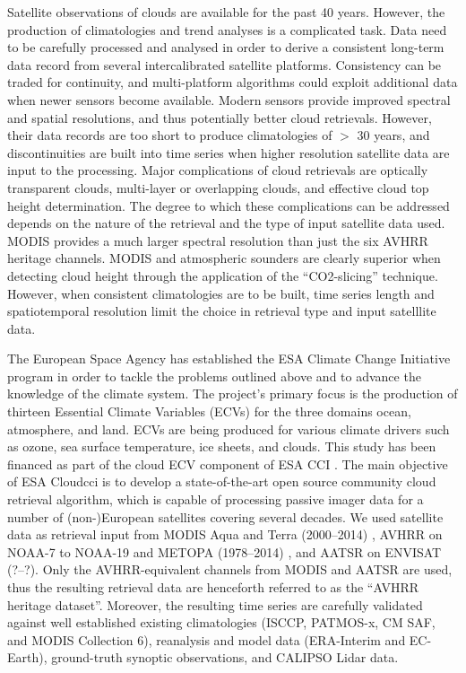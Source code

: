 Satellite observations of clouds are available for the past 40 years. However,
the production of climatologies and trend analyses is a complicated
task. Data need to be carefully processed and analysed in order
to derive a consistent long-term data record from several intercalibrated satellite
platforms. Consistency can be traded for continuity, and multi-platform
algorithms could exploit additional data when newer sensors become
available. Modern sensors provide improved spectral and spatial resolutions,
and thus potentially better cloud retrievals. However, their data records are too short to produce
climatologies of $>$ 30 years, and discontinuities are built into time series
when higher resolution satellite data are input to the processing.
Major complications of cloud retrievals are optically transparent clouds, multi-layer or overlapping clouds, and effective cloud top height determination. The degree to which these complications can be addressed depends on the nature of the retrieval and the type of input satellite data used. MODIS provides a much larger spectral resolution than just the six AVHRR heritage channels. MODIS and atmospheric sounders are clearly superior when detecting cloud height through the application of the ``CO2-slicing'' technique. However, when consistent climatologies are to be built, time series length and spatiotemporal resolution limit the choice in retrieval type and input satelllite data.  

\newpage

The European Space Agency has established the ESA Climate
Change Initiative program \citep{ESA_CCI_web,Hollmann13} in order to tackle
the problems outlined above and to advance the knowledge of the climate system.
The project's primary focus is the production of
thirteen Essential Climate Variables (ECVs) for the three domains ocean,
atmosphere, and land. ECVs are being produced for various climate drivers such as ozone, sea surface
temperature, ice sheets, and clouds. This study has been financed as part of the cloud ECV component of
ESA CCI \citep{ESA_Cloud_CCI_web}.
The main objective of ESA Cloud\textunderscore cci is to develop a state-of-the-art open source community
cloud retrieval algorithm, which is capable of processing passive imager data for a
number of \mbox{(non-)European} satellites covering several decades.
We used satellite data as retrieval input from MODIS Aqua and Terra (2000--2014) \citep{King92}, AVHRR on NOAA-7 to
NOAA-19 and METOPA (1978--2014) \citep{Jacobowitz03}, and AATSR on ENVISAT (?--?).
Only the AVHRR-equivalent channels from MODIS and AATSR are
used, thus the resulting retrieval data are henceforth referred to as the ``AVHRR heritage
dataset''. Moreover, the
resulting time series are carefully validated against well established existing climatologies (ISCCP, PATMOS-x, CM SAF, and MODIS
Collection 6), reanalysis and model data (ERA-Interim and EC-Earth),
ground-truth synoptic observations, and CALIPSO Lidar data.

